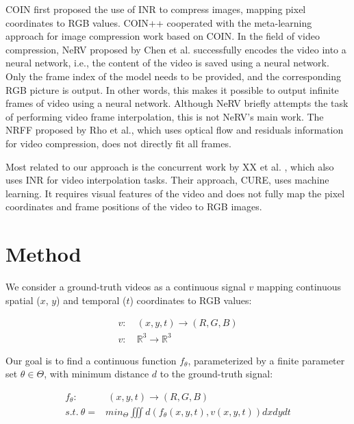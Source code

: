 \documentclass{article}
\begin{document}
COIN \cite{dupont2021coin} first proposed the use of INR to compress images, mapping pixel coordinates to RGB values.
COIN++ \cite{dupont2022coin++} cooperated with the meta-learning approach for image compression work based on COIN.
In the field of video compression, NeRV \cite{chen2021nerv} proposed by Chen et al. successfully encodes the video into a neural network, i.e., the content of the video is saved using a neural network.
Only the frame index of the model needs to be provided, and the corresponding RGB picture is output.
In other words, this makes it possible to output infinite frames of video using a neural network.
Although NeRV briefly attempts the task of performing video frame interpolation, this is not NeRV's main work.
The NRFF \cite{rho2022neural} proposed by Rho et al., which uses optical flow and residuals information for video compression, does not directly fit all frames.

Most related to our approach is the concurrent work by XX et al. \cite{shangguan2022learning}, which also uses INR for video interpolation tasks.
Their approach, CURE, uses machine learning.
It requires visual features of the video and does not fully map the pixel coordinates and frame positions of the video to RGB images.


\section{Method}

We consider a ground-truth videos as a continuous signal $v$ mapping continuous spatial ($x$, $y$) and temporal ($t$) coordinates to RGB values:

\begin{equation}
\begin{aligned}
v:& \: (x, y, t) \rightarrow (R, G, B) \\
v:& \: \mathbb{R}^3 \rightarrow \mathbb{R}^3
\end{aligned}
\end{equation}

Our goal is to find a continuous function $f_{\theta}$, parameterized by a finite parameter set $\theta \in \Theta$,
with minimum distance $d$ to the ground-truth signal:

\begin{equation}
\begin{aligned}
f_{\theta}:& \:(x, y, t) \rightarrow (R, G, B) \\
s.t. \: \theta =& min_{\Theta} \iiint d(f_{\theta}(x,y,t), v(x,y,t)) dx dy dt
\end{aligned}
\end{equation}
\end{document}
